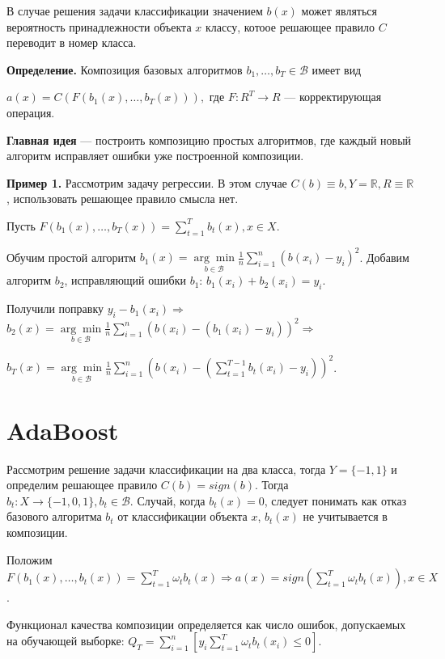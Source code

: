 \documentclass[specialist, 12pt, href]{article}
\begin{document}
В случае решения задачи классификации значением $b(x)$ может являться вероятность принадлежности объекта $x$ классу, котоое решающее правило $C$ переводит в номер класса.

\textbf{Определение.} Композиция базовых алгоритмов $b_1,\dots, b_T \in \mathcal{B}$ имеет вид

 $a(x) = C(F(b_1(x),\dots,b_T(x))),$ где $F:R^T \rightarrow R$ --- корректирующая операция.

\textbf{Главная идея} --- построить композицию простых алгоритмов, где каждый новый алгоритм исправляет ошибки уже построенной композиции.

\textbf{Пример 1.} Рассмотрим задачу регрессии. В этом случае $C(b) \equiv b, Y = \mathbb{R}, R \equiv \mathbb{R}$, использовать решающее правило смысла нет. 

Пусть $F(b_1(x),\dots,b_T(x)) = \sum\limits_{t = 1}^{T}{b_t(x)}, x \in X$. 

Обучим простой алгоритм $b_1(x) = \underset{b \in \mathcal{B}}{\arg\min} \frac{1}{n}\sum\limits_{i = 1}^{n}{(b(x_i) - y_i)^2}$. Добавим алгоритм $b_2$, исправляющий ошибки $b_1$: $b_1(x_i) + b_2(x_i) = y_i$.

Получили поправку $y_i-b_1(x_i) \Rightarrow$ $b_2(x) =  \underset{b  \in \mathcal{B}}{\arg\min} \frac{1}{n}\sum\limits_{i = 1}^{n}{(b(x_i) -(b_1(x_i) - y_i))^2} \Rightarrow$ 

$b_T(x) =  \underset{b  \in \mathcal{B}}{\arg\min} \frac{1}{n}\sum\limits_{i = 1}^{n}{(b(x_i) -(\sum\limits_{t = 1}^{T-1}b_t(x_i) - y_i))^2}$. 

\section{AdaBoost}

Рассмотрим решение задачи классификации на два класса, тогда $Y = \{-1,1\}$ и определим решающее правило $C(b) = sign(b)$. Тогда $b_t:X \rightarrow \{-1,0,1\}, b_t \in \mathcal{B}$. Случай, когда $b_t(x) = 0$, следует понимать как отказ базового алгоритма $b_t$ от классификации объекта $x$, $b_t(x)$ не учитывается в композиции. 

Положим $F(b_1(x),\dots,b_t(x)) = \sum\limits_{t = 1}^{T}{\omega_tb_t(x)} \Rightarrow a(x) = sign(\sum\limits_{t = 1}^{T}{\omega_tb_t(x)}), x \in X$.

Функционал качества композиции определяется как число ошибок, допускаемых на обучающей выборке: $Q_T = \sum\limits_{i=1}^n{[y_i\sum\limits_{t=1}^T\omega_tb_t(x_i) \leq 0]}$.
\end{document}
